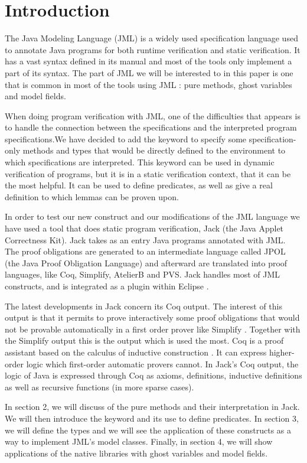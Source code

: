 
\section{Introduction}
The Java Modeling Language (JML) is a widely used specification language 
used to annotate Java programs for both runtime verification and static 
verification. It has a vast syntax defined in its manual and most of the 
tools only implement a part of its syntax. The part of JML we will be 
interested to in this paper is one that is common in most of the tools 
using JML \cite{BurdyEtAl05:STTT}: pure methods, ghost variables and  
model fields. 

When doing program verification with JML, one of the difficulties that appears
is to handle the connection between the specifications and the interpreted 
program specifications.We have decided to add the keyword 
to specify some specification-only methods and types that would be 
directly defined to the environment to which specifications are interpreted. 
This keyword can be used in dynamic verification of programs, 
but it is in a static verification context, that it can be the most helpful.
It can be used to define predicates, as well as give a real definition 
to which lemmas can be proven upon.

In order to test our new construct and our modifications of the JML language 
we have used a tool that does static program verification,  Jack 
(the Java Applet Correctness Kit)\cite{BRL-03-JACK,Jack-Web}. 
Jack takes as an entry Java programs annotated with JML. 
The proof obligations are generated to an intermediate language called JPOL 
(the Java Proof Obligation Language) and afterward are translated into 
proof languages, like Coq, Simplify, AtelierB and PVS. 
Jack handles most of JML constructs, and is integrated as a plugin within 
Eclipse \cite{Eclipse-Web}.

The latest developments in Jack concern its Coq output. 
The interest of this output is that it permits to prove interactively some 
proof obligations that would not be provable automatically in a first order 
prover like Simplify \cite{simplify}.
Together with the Simplify output this is the output which is used the most.
Coq is a proof assistant based on the calculus of inductive construction 
\cite{coq}. 
It can express 
higher-order logic which first-order automatic provers cannot. In Jack's Coq 
output, the logic of Java is  expressed through Coq as axioms, definitions, 
inductive definitions as well as recursive 
functions (in more sparse cases).

In section 2,  we will discuss of the pure methods and their interpretation 
in Jack. We will then introduce
the  keyword and its use to define predicates.
In section 3, we will define the  types and we will see the 
application of these constructs 
as a way to implement JML's model classes.
Finally, in section 4, we will show applications of the native libraries with 
 ghost variables and model fields.
